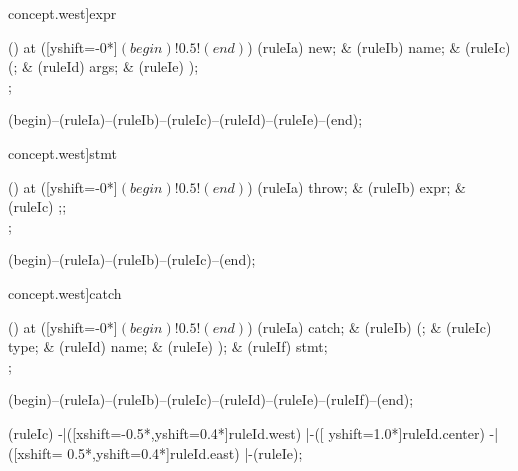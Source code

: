 \begin{syntax}[[xshift=22mm]concept.west]{expr}
  
  \node[sequence,column sep=1.1cm] () at ([yshift=-0*\syntaxruledist]$(begin)!0.5!(end)$) {
    \node[terminal]    (ruleIa) {new};
    &
    \node[nonterminal] (ruleIb) {name};
    &
    \node[terminal]    (ruleIc) {(};
    &
    \node[nonterminal] (ruleId) {args};
    &
    \node[terminal]    (ruleIe) {)};
    \\
  };
  
  \draw[path] (begin)--(ruleIa)--(ruleIb)--(ruleIc)--(ruleId)--(ruleIe)--(end);
\end{syntax}

\begin{syntax}[[xshift=22mm]concept.west]{stmt}
  
  \node[sequence,column sep=2.0cm] () at ([yshift=-0*\syntaxruledist]$(begin)!0.5!(end)$) {
    \node[terminal]    (ruleIa) {throw};
    &
    \node[nonterminal] (ruleIb) {expr};
    &
    \node[terminal]    (ruleIc) {;};
    \\
  };
  
  \draw[path] (begin)--(ruleIa)--(ruleIb)--(ruleIc)--(end);
\end{syntax}

\begin{syntax}[[xshift=22mm]concept.west]{catch}
  
  \node[sequence,column sep=1.1cm] () at ([yshift=-0*\syntaxruledist]$(begin)!0.5!(end)$) {
    \node[terminal]    (ruleIa) {catch};
    &
    \node[terminal]    (ruleIb) {(};
    &
    \node[nonterminal] (ruleIc) {type};
    &
    \node[nonterminal] (ruleId) {name};
    &
    \node[terminal]    (ruleIe) {)};
    &
    \node[nonterminal] (ruleIf) {stmt};
    \\
  };
  
  \draw[path] (begin)--(ruleIa)--(ruleIb)--(ruleIc)--(ruleId)--(ruleIe)--(ruleIf)--(end);
  
  \draw[path] (ruleIc)
            -|([xshift=-0.5*\syntaxruledist,yshift=0.4*\syntaxruledist]ruleId.west)
            |-([                             yshift=1.0*\syntaxruledist]ruleId.center)
            -|([xshift= 0.5*\syntaxruledist,yshift=0.4*\syntaxruledist]ruleId.east)
            |-(ruleIe);
\end{syntax}

